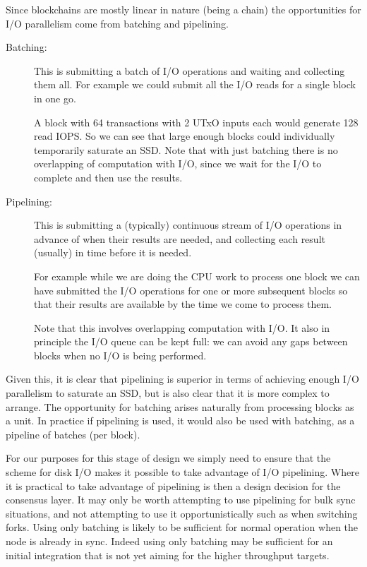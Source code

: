 \documentclass[11pt,a4paper]{article}
\begin{document}
Since blockchains are mostly linear in nature (being a chain) the opportunities
for I/O parallelism come from batching and pipelining.
\begin{description}
\item[Batching:] This is submitting a batch of I/O operations and waiting and
                collecting them all. For example we could submit all the I/O
                reads for a single block in one go.

                A block with 64 transactions with 2 UTxO inputs each would
                generate 128 read IOPS. So we can see that large enough blocks
                could individually temporarily saturate an SSD. Note that with
                just batching there is no overlapping of computation with I/O,
                since we wait for the I/O to complete and then use the results.

\item[Pipelining:] This is submitting a (typically) continuous stream of I/O
                operations in advance of when their results are needed, and
                collecting each result (usually) in time before it is needed.

                For example while we are doing the CPU work to process one
                block we can have submitted the I/O operations for one or more
                subsequent blocks so that their results are available by the
                time we come to process them.

                Note that this involves overlapping computation with I/O. It
                also in principle the I/O queue can be kept full: we can avoid
                any gaps between blocks when no I/O is being performed.
\end{description}
Given this, it is clear that pipelining is superior in terms of achieving
enough I/O parallelism to saturate an SSD, but is also clear that it is more
complex to arrange. The opportunity for batching arises naturally from
processing blocks as a unit. In practice if pipelining is used, it would also
be used with batching, as a pipeline of batches (per block).

For our purposes for this stage of design we simply need to ensure that the
scheme for disk I/O makes it possible to take advantage of I/O pipelining.
Where it is practical to take advantage of pipelining is then a design decision
for the consensus layer. It may only be worth attempting to use pipelining for
bulk sync situations, and not attempting to use it opportunistically such as
when switching forks. Using only batching is likely to be sufficient for normal
operation when the node is already in sync. Indeed using only batching may be
sufficient for an initial integration that is not yet aiming for the higher
throughput targets.
\end{document}
